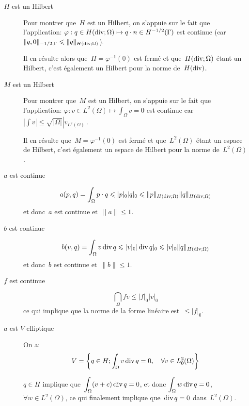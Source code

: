\begin{description}
\item[$H$ est un Hilbert]
Pour montrer que~$H$ est un Hilbert, on s'appuie sur le fait que l'application:
$\varphi: q\in H(\operatorname{div};\Omega)\mapsto q\cdot n\in H^{-1/2}(\Gamma)$ est continue (car~$\|q,0\|_{-1/2,\Gamma}\leqslant \|q\|_{H(\operatorname{div};\Omega)}$).

Il en résulte alors que~$H=\varphi^{-1}(0)$ est fermé et que~$H(\operatorname{div};\Omega)$ étant un Hilbert, c'est également un Hilbert pour la norme de~$H(\operatorname{div})$.

\medskip
\item[$M$ est un Hilbert]
Pour montrer que~$M$ est un Hilbert, on s'appuie sur le fait que l'application:
$\varphi: v\in L^2(\Omega)\mapsto \int_\Omega v=0$ est continue
car~$|\int v| \le \sqrt{|\Omega|} |v_{L^2(\Omega)}|$.

Il en résulte que~$M=\varphi^{-1}(0)$ est fermé et que~$L^2(\Omega)$ étant un espace de Hilbert, c'est également un espace de Hilbert pour la norme de~$L^2(\Omega)$.

\medskip
\item[$a$ est continue]
\begin{equation}a(p,q)=\displaystyle\int_\Omega p\cdot q\leqslant |p|_0 |q|_0 \leqslant \|p\|_{H(\operatorname{div};\Omega)} \|q\|_{H(\operatorname{div};\Omega)}\end{equation}
et donc~$a$ est continue et~$\|a\|\le 1$.

\medskip
\item[$b$ est continue]
\begin{equation}b(v,q)=\displaystyle\int_\Omega v \operatorname{div} q \leqslant |v|_0 |\operatorname{div} q|_0 \leqslant |v|_0 \|q\|_{H(\operatorname{div};\Omega)}\end{equation}
et donc~$b$ est continue et~$\|b\|\le 1$.

\medskip
\item[$f$ est continue]
\begin{equation}\dint_\Omega fv\le |f|_0 |v|_0\end{equation} ce qui implique que la norme de la forme linéaire est~$\le |f|_0$.

\medskip
\item[$a$ est $V$-elliptique]
On a:
\begin{equation}V=\left\{ q\in H; \displaystyle\int_\Omega v \operatorname{div} q =0,\quad \forall v\in L^2_0(\Omega)\right\}\end{equation}

$q\in H$ implique que~$\displaystyle\int_\Omega (v+c)\operatorname{div} q =0$, et donc $\displaystyle\int_\Omega w \operatorname{div} q=0$, $\forall w\in L^2(\Omega)$, ce qui finalement implique que~$\operatorname{div} q=0$ dans~$L^2(\Omega)$.


\end{description}
